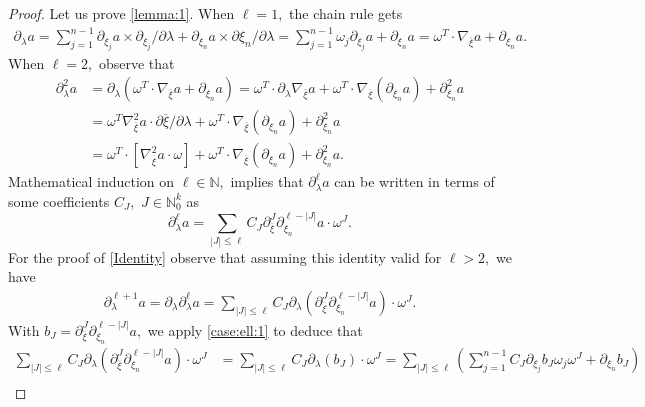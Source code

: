 \documentclass[12pt, reqno]{amsart}
\theoremstyle{definition}
\theoremstyle{remark}
\numberwithin{equation}{section}
\begin{document}
\begin{proof} Let us prove \eqref{lemma:1}. When $\ell=1,$
    the chain rule gets
\begin{align}\label{case:ell:1}
    \partial_\lambda a=\sum_{j=1}^{n-1}\partial_{\xi_j}a\times \partial_{\xi_j}/\partial{\lambda}+\partial_{\xi_n}a\times \partial{\xi_n}/\partial\lambda= \sum_{j=1}^{n-1}\omega_j\partial_{\xi_j}a+\partial_{\xi_n}a=\omega^T\cdot \nabla_{\overline{\xi}}a+\partial_{\xi_{n}}a.
\end{align}When $\ell=2,$  observe that
\begin{align*}
    \partial_\lambda^2 a &=\partial_\lambda(\omega^T\cdot \nabla_{\overline{\xi}}a+\partial_{\xi_{n}}a)=\omega^T\cdot\partial_\lambda \nabla_{\overline{\xi}}a+\omega^{T}\cdot \nabla_{\overline{\xi}}(\partial_{\xi_n}a)+\partial_{\xi_{n}}^2a\\
    &=\omega^{T}\nabla^{2}_{\overline{\xi}}a\cdot \partial{\overline{\xi}}/\partial\lambda+\omega^{T}\cdot \nabla_{\overline{\xi}}(\partial_{\xi_n}a)+\partial_{\xi_{n}}^2a\\
    &=\omega^{T}\cdot[ \nabla^{2}_{\overline{\xi}}a\cdot \omega]+\omega^{T}\cdot \nabla_{\overline{\xi}}(\partial_{\xi_n}a)+ \partial_{\xi_{n}}^2a.
\end{align*} Mathematical induction on $\ell \in \mathbb{N},$
implies that $\partial^\ell_\lambda a$ can be written in terms of some coefficients $C_{J},$ $J\in \mathbb{N}_0^k$ as
\begin{equation}\label{Identity}
  \partial^\ell_\lambda a=\sum_{|J|\leq \ell }C_{J}\partial_{\overline{\xi}}^{J}\partial_{\xi_n}^{\ell-|J|}a\cdot \omega^{J}.
\end{equation} For the proof of \eqref{Identity}
observe that assuming this identity valid for $\ell>2,$  we have
\begin{align*}
    \partial^{\ell+1}_\lambda a=\partial_{\lambda}\partial^{\ell}_\lambda a=\sum_{|J|\leq \ell }C_{J}\partial_{\lambda}(\partial_{\overline{\xi}}^{J}\partial_{\xi_n}^{\ell-|J|}a)\cdot \omega^{J}.
\end{align*}With $b_{J}=\partial_{\overline{\xi}}^{J}\partial_{\xi_n}^{\ell-|J|}a,$ we apply \eqref{case:ell:1} to deduce that
\begin{align*}
  \sum_{|J|\leq \ell }C_{J}\partial_{\lambda}(\partial_{\overline{\xi}}^{J}\partial_{\xi_n}^{\ell-|J|}a)\cdot \omega^{J}&=\sum_{|J|\leq \ell }C_{J}\partial_{\lambda}(b_J)\cdot \omega^{J}  =\sum_{|J|\leq \ell }\left(\sum_{j=1}^{n-1}C_{J}\partial_{\xi_j}b_J\omega_j\omega^{J}+\partial_{\xi_n}b_J\right)\\

\end{align*}
\end{proof}
\end{document}

